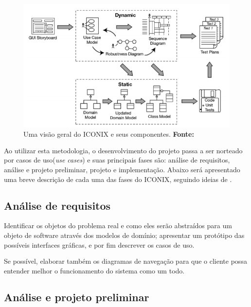 \begin{figure}[h!]
	\centerline{\includegraphics[scale=0.95]{./imagens/visao_geral_iconix.png}}
	\caption[Uma visão geral do ICONIX e seus componentes.]
	{Uma visão geral do ICONIX e seus componentes. \textbf{Fonte:} }
	\label{fig:exemplo1}
\end{figure}

\newpage %

\par Ao utilizar esta metodologia, o desenvolvimento do projeto passa a ser norteado por casos de uso(\textit{use cases}) e suas principais fases são: análise de requisitos, análise e projeto preliminar, projeto e implementação. Abaixo será apresentado uma breve descrição de cada uma das fases do ICONIX, seguindo ideias de .

\subsection{Análise de requisitos}

Identificar os objetos do problema real e como eles serão abstraídos para um objeto de software através dos modelos de domínio; apresentar um protótipo das possíveis interfaces gráficas, e por fim descrever os casos de uso. 

Se possível, elaborar também os diagramas de navegação para que o cliente possa entender melhor o funcionamento do sistema como um todo.

\subsection{Análise e projeto preliminar}

